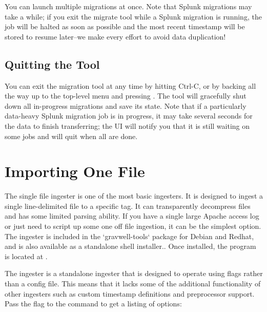 You can launch multiple migrations at once. Note that Splunk migrations may take a while; if you exit the migrate tool while a Splunk migration is running, the job will be halted as soon as possible and the most recent timestamp will be stored to resume later--we make every effort to avoid data duplication!

\subsection{Quitting the Tool}

You can exit the migration tool at any time by hitting Ctrl-C, or by backing all the way up to the top-level menu and pressing . The tool will gracefully shut down all in-progress migrations and save its state. Note that if a particularly data-heavy Splunk migration job is in progress, it may take several seconds for the data to finish transferring; the UI will notify you that it is still waiting on some jobs and will quit when all are done.



\clearpage

\section{Importing One File}
The single file ingester is one of the most basic ingesters.  It is designed to ingest a single line-delimited file to a specific tag.  It can transparently decompress files and has some limited parsing ability.  If you have a single large Apache access log or just need to script up some one off file ingestion, it can be the simplest option. The ingester is included in the `gravwell-tools` package for Debian and Redhat, and is also available as a standalone shell installer.. Once installed, the program is located at .

The ingester is a standalone ingester that is designed to operate using flags rather than a config file.  This means that it lacks some of the additional functionality of other ingesters such as custom timestamp definitions and preprocessor support.  Pass the  flag to the command to get a listing of options:

